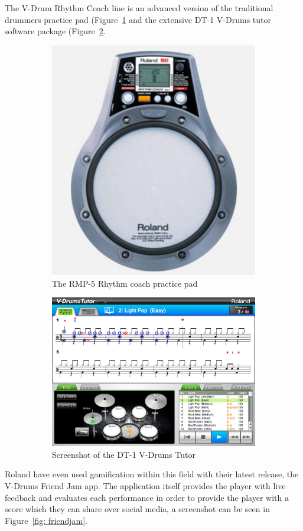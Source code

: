 \documentclass[a4paper, 11pt]{article}
\begin{document}
The V-Drum Rhythm Coach line is an advanced version of the traditional drummers practice pad (Figure~\ref{fig: rmp-5} and the extensive DT-1 V-Drums tutor software package (Figure~\ref{fig: dt-1}. 
\begin{figure}[ht]
\centering
\begin{subfigure}{.5\textwidth}
  \centering
  \includegraphics[width=0.5\linewidth]{images/rmp-5.jpg}
  \caption{The RMP-5 Rhythm coach practice pad}
  \label{fig: rmp-5}
\end{subfigure}%
\begin{subfigure}{.5\textwidth}
  \centering
  \includegraphics[width=0.75\linewidth]{images/dt-1_ss_main_notation_gal.jpg}
  \caption{Screenshot of the DT-1 V-Drums Tutor}
  \label{fig: dt-1}
\end{subfigure}
\caption{}
\label{fig: roland systems}
\end{figure}
Roland have even used gamification within this field with their latest release, the V-Drums Friend Jam app. The application itself provides the player with live feedback and evaluates each performance in order to provide the player with a score which they can share over social media, a screenshot can be seen in Figure~\ref{fig: friendjam}. \par
\end{document}
